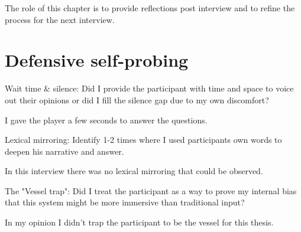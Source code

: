 
The role of this chapter is to provide reflections post interview and to refine the process for the next interview.

\section{Defensive self-probing}

\begin{QandA}
   \item Wait time \& silence: Did I provide the participant with time and space to voice out their opinions or did I fill the silence gap due to my own discomfort?
        \begin{answered}
           I gave the player a few seconds to answer the questions.
        \end{answered}

   \item Lexical mirroring: Identify 1-2 times where I used participants own words to deepen his narrative and answer.

        \begin{answered}
        In this interview there was no lexical mirroring that could be observed.
        \end{answered}

    \item The "Vessel trap": Did I treat the participant as a way to prove my internal bias that this system might be more immersive than traditional input?

        \begin{answered}
            In my opinion I didn't trap the participant to be the vessel for this thesis.
        \end{answered}
\end{QandA}



    


